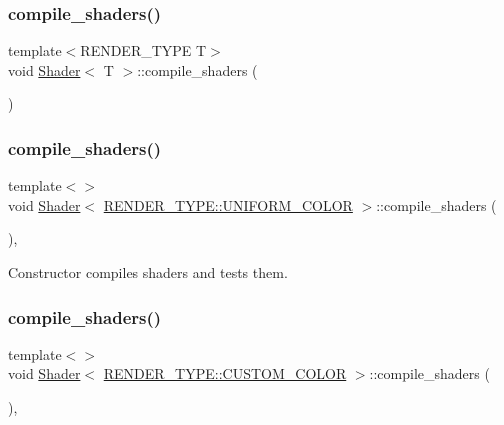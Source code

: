 \subsubsection{\texorpdfstring{compile\+\_\+shaders()}{compile\_shaders()}\hspace{0.1cm}{\footnotesize\ttfamily [1/3]}}
{\footnotesize\ttfamily template$<$R\+E\+N\+D\+E\+R\+\_\+\+T\+Y\+PE T$>$ \\
void \mbox{\hyperlink{classShader}{Shader}}$<$ T $>$\+::compile\+\_\+shaders (\begin{DoxyParamCaption}{ }\end{DoxyParamCaption})\hspace{0.3cm}{\ttfamily [protected]}}

\mbox{\label{classShader_a3ffd553eceda4e9d5a1d8b4a5a157659}} 
\subsubsection{\texorpdfstring{compile\+\_\+shaders()}{compile\_shaders()}\hspace{0.1cm}{\footnotesize\ttfamily [2/3]}}
{\footnotesize\ttfamily template$<$$>$ \\
void \mbox{\hyperlink{classShader}{Shader}}$<$ \mbox{\hyperlink{render_8hpp_a24e288e18eb7b6e01de7565001fedb60aa98862073f71a928bad5099cc3e1c2ed}{R\+E\+N\+D\+E\+R\+\_\+\+T\+Y\+P\+E\+::\+U\+N\+I\+F\+O\+R\+M\+\_\+\+C\+O\+L\+OR}} $>$\+::compile\+\_\+shaders (\begin{DoxyParamCaption}{ }\end{DoxyParamCaption})\hspace{0.3cm}{\ttfamily [inline]}, {\ttfamily [protected]}}



Constructor compiles shaders and tests them. 

\mbox{\label{classShader_ae486635d367b6054482c56747ed74846}} 
\subsubsection{\texorpdfstring{compile\+\_\+shaders()}{compile\_shaders()}\hspace{0.1cm}{\footnotesize\ttfamily [3/3]}}
{\footnotesize\ttfamily template$<$$>$ \\
void \mbox{\hyperlink{classShader}{Shader}}$<$ \mbox{\hyperlink{render_8hpp_a24e288e18eb7b6e01de7565001fedb60a9d34355b5a26c54b5dbab1e45245a6f4}{R\+E\+N\+D\+E\+R\+\_\+\+T\+Y\+P\+E\+::\+C\+U\+S\+T\+O\+M\+\_\+\+C\+O\+L\+OR}} $>$\+::compile\+\_\+shaders (\begin{DoxyParamCaption}{ }\end{DoxyParamCaption})\hspace{0.3cm}{\ttfamily [inline]}, {\ttfamily [protected]}}



